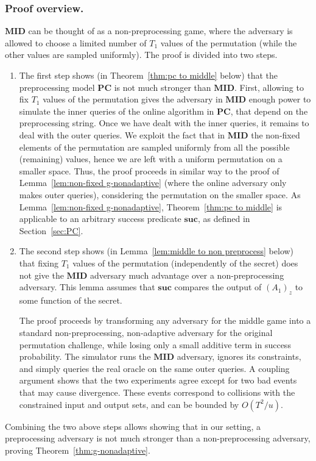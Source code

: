 \documentclass[11pt]{article}
\newcommand{\SUC}{\boldsymbol{suc}}
\newcommand{\PC}{\boldsymbol{PC}}
\newcommand{\MID}{\boldsymbol{MID}}
\begin{document}
\subsubsection{Proof overview.}
$\MID$ can be thought of as a non-preprocessing game, 
where the adversary is allowed to choose a limited number of $T_1$ values of the permutation (while the other values are sampled uniformly).
The proof is divided into two steps.
\begin{enumerate}
  \item The first step shows (in Theorem~\ref{thm:pc to middle} below)
        that the preprocessing model $\PC$ is not much stronger than $\MID$.
        First, allowing to fix $T_1$ values of the permutation
        gives the adversary in $\MID$ enough power to simulate the inner queries of the online algorithm in $\PC$,
        that depend on the preprocessing string.
        Once we have dealt with the inner queries, it remains to deal with the outer queries.
        We exploit the fact that in $\MID$ the non-fixed elements of the permutation are sampled uniformly
        from all the possible (remaining) values, hence we are left with a uniform permutation on a smaller space. 
        Thus, the proof proceeds in similar way to the proof of Lemma~\ref{lem:non-fixed g-nonadaptive}
        (where the online adversary only makes outer queries),
        considering the permutation on the smaller space. 
        As Lemma~\ref{lem:non-fixed g-nonadaptive}, Theorem~\ref{thm:pc to middle} is applicable to an arbitrary success predicate $\SUC$, as defined in Section~\ref{sec:PC}. 
  \item The second step shows (in Lemma~\ref{lem:middle to non preprocess} below) that fixing $T_1$ values of the permutation (independently of the secret) does not give the $\MID$ adversary much advantage over a non-preprocessing adversary.
        This lemma assumes that $\SUC$ compares the output of $(A_1)_z$ to some function of the secret.

    The proof proceeds by transforming any adversary for the middle game into a standard non-preprocessing, non-adaptive adversary for the original permutation challenge, while losing only a small additive term in success probability. The simulator runs the $\MID$ adversary, ignores its constraints, and simply queries the real oracle on the same outer queries. A coupling argument shows that the two experiments agree except for two bad events that may cause divergence. These events correspond to collisions with the constrained input and output sets, and can be bounded by $O(T^2/u)$.
\end{enumerate}
Combining the two above steps allows showing that in our setting, a preprocessing adversary is not much stronger than a non-preprocessing adversary,
proving Theorem~\ref{thm:g-nonadaptive}.
\end{document}
